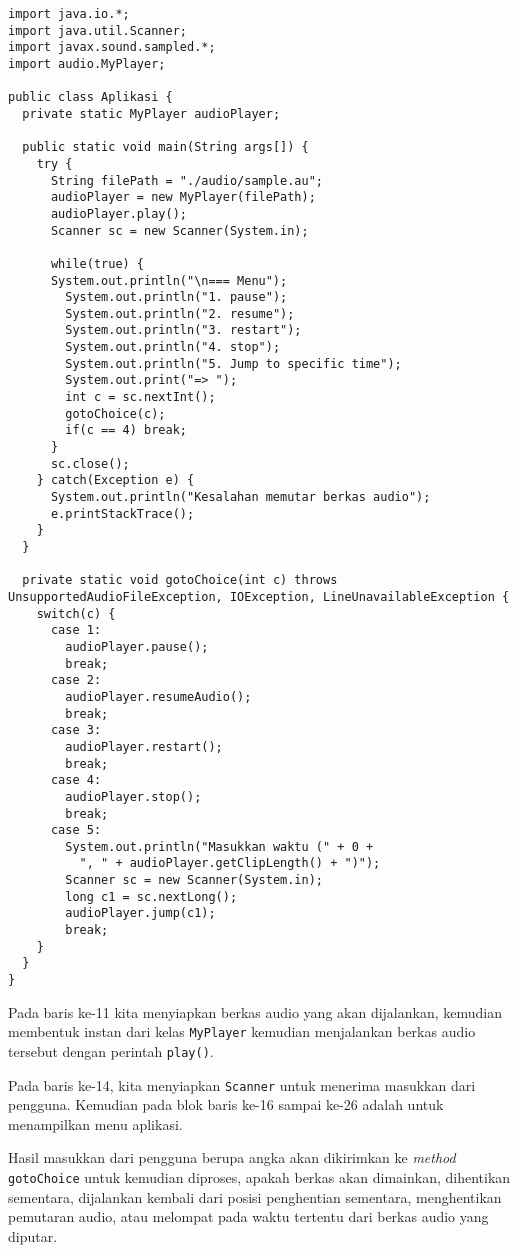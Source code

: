 \begin{lstlisting}
import java.io.*;
import java.util.Scanner;
import javax.sound.sampled.*;
import audio.MyPlayer;

public class Aplikasi {
  private static MyPlayer audioPlayer;
  
  public static void main(String args[]) {
    try {
      String filePath = "./audio/sample.au";
      audioPlayer = new MyPlayer(filePath);
      audioPlayer.play();
      Scanner sc = new Scanner(System.in);
      
      while(true) {
      System.out.println("\n=== Menu");
        System.out.println("1. pause");
        System.out.println("2. resume");
        System.out.println("3. restart");
        System.out.println("4. stop");
        System.out.println("5. Jump to specific time");
        System.out.print("=> ");
        int c = sc.nextInt();
        gotoChoice(c);
        if(c == 4) break;
      }
      sc.close();	
    } catch(Exception e) {
      System.out.println("Kesalahan memutar berkas audio");
      e.printStackTrace();
    }
  }
  
  private static void gotoChoice(int c) throws UnsupportedAudioFileException, IOException, LineUnavailableException {
    switch(c) {
      case 1: 
        audioPlayer.pause();
        break;
      case 2:
        audioPlayer.resumeAudio();
        break;
      case 3: 
        audioPlayer.restart();
        break;
      case 4:
        audioPlayer.stop();
        break;
      case 5:
        System.out.println("Masukkan waktu (" + 0 + 
          ", " + audioPlayer.getClipLength() + ")");
        Scanner sc = new Scanner(System.in);
        long c1 = sc.nextLong();
        audioPlayer.jump(c1);
        break;
    }
  }
}
\end{lstlisting}

Pada baris ke-11 kita menyiapkan berkas audio yang akan dijalankan, kemudian membentuk instan dari kelas \texttt{MyPlayer} kemudian menjalankan berkas audio tersebut dengan perintah \texttt{play()}.

Pada baris ke-14, kita menyiapkan \texttt{Scanner} untuk menerima masukkan dari pengguna. Kemudian pada blok baris ke-16 sampai ke-26 adalah untuk menampilkan menu aplikasi.

Hasil masukkan dari pengguna berupa angka akan dikirimkan ke \textit{method} \texttt{gotoChoice} untuk kemudian diproses, apakah berkas akan dimainkan, dihentikan sementara, dijalankan kembali dari posisi penghentian sementara, menghentikan pemutaran audio, atau melompat pada waktu tertentu dari berkas audio yang diputar.


